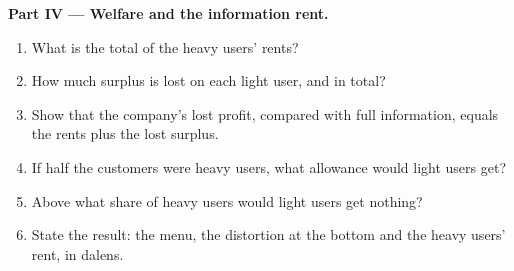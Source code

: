 \begin{problem}
\medskip
\noindent\textbf{Part IV --- Welfare and the information rent.}
\begin{enumerate}[resume]
  \item What is the total of the heavy users' rents?
  \item How much surplus is lost on each light user, and in total?
  \item Show that the company's lost profit, compared with full information, equals the rents plus the lost surplus.
  \item If half the customers were heavy users, what allowance would light users get?
  \item Above what share of heavy users would light users get nothing?
  \item State the result: the menu, the distortion at the bottom and the heavy users' rent, in dalens.
\end{enumerate}
\end{problem}
